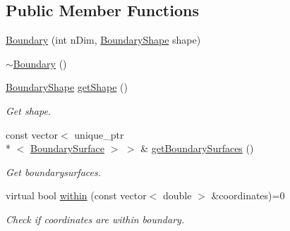 \subsection*{Public Member Functions}
\begin{DoxyCompactItemize}
\item 
\hyperlink{classBoundary_ac6eb3bf752b27d4d799c4d2691b312ce}{Boundary} (int n\+Dim, \hyperlink{Boundary_8h_a0099b369f2bc119c1b54728734b41132}{Boundary\+Shape} shape)
\item 
\hyperlink{classBoundary_a86eab4f2362618c5b1e3d0df3a5f7f42}{$\sim$\+Boundary} ()
\item 
\hyperlink{Boundary_8h_a0099b369f2bc119c1b54728734b41132}{Boundary\+Shape} \hyperlink{classBoundary_a20d2121527b207eed35f6719393e3499}{get\+Shape} ()
\begin{DoxyCompactList}\small\item\em Get shape. \end{DoxyCompactList}\item 
const vector$<$ unique\+\_\+ptr\\*
$<$ \hyperlink{classBoundarySurface}{Boundary\+Surface} $>$ $>$ \& \hyperlink{classBoundary_acfa6640f65c432e339108887913539eb}{get\+Boundary\+Surfaces} ()
\begin{DoxyCompactList}\small\item\em Get boundarysurfaces. \end{DoxyCompactList}\item 
virtual bool \hyperlink{classBoundary_aef1af10ace9eae30e86b6bd23087b3ff}{within} (const vector$<$ double $>$ \&coordinates)=0
\begin{DoxyCompactList}\small\item\em Check if coordinates are within boundary. \end{DoxyCompactList}\end{DoxyCompactItemize}
